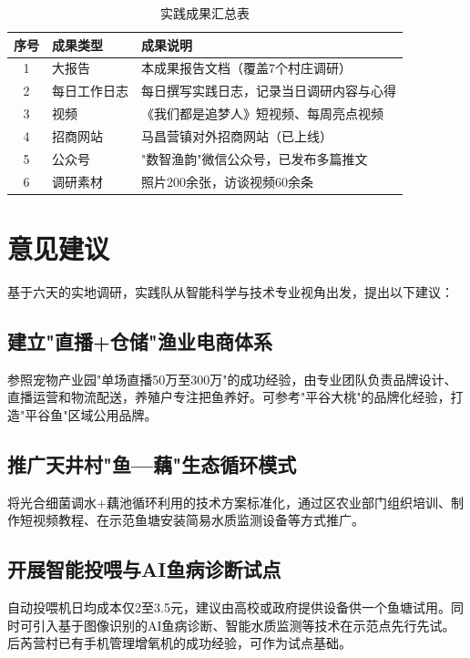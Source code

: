 \documentclass[12pt,a4paper]{article}
\begin{document}
\begin{table}[H]
\centering
\caption{实践成果汇总表}
\begin{tabular}{clp{8cm}}
\toprule
\textbf{序号} & \textbf{成果类型} & \textbf{成果说明} \\
\midrule
1 & 大报告 & 本成果报告文档（覆盖7个村庄调研） \\
2 & 每日工作日志 & 每日撰写实践日志，记录当日调研内容与心得 \\
3 & 视频 & 《我们都是追梦人》短视频、每周亮点视频 \\
4 & 招商网站 & 马昌营镇对外招商网站（已上线） \\
5 & 公众号 & "数智渔韵"微信公众号，已发布多篇推文 \\
6 & 调研素材 & 照片200余张，访谈视频60余条 \\
\bottomrule
\end{tabular}
\end{table}

\section{意见建议}

基于六天的实地调研，实践队从智能科学与技术专业视角出发，提出以下建议：

\subsection{建立"直播+仓储"渔业电商体系}

参照宠物产业园"单场直播50万至300万"的成功经验，由专业团队负责品牌设计、直播运营和物流配送，养殖户专注把鱼养好。可参考"平谷大桃"的品牌化经验，打造"平谷鱼"区域公用品牌。

\subsection{推广天井村"鱼---藕"生态循环模式}

将光合细菌调水+藕池循环利用的技术方案标准化，通过区农业部门组织培训、制作短视频教程、在示范鱼塘安装简易水质监测设备等方式推广。

\subsection{开展智能投喂与AI鱼病诊断试点}

自动投喂机日均成本仅2至3.5元，建议由高校或政府提供设备供一个鱼塘试用。同时可引入基于图像识别的AI鱼病诊断、智能水质监测等技术在示范点先行先试。后芮营村已有手机管理增氧机的成功经验，可作为试点基础。
\end{document}

